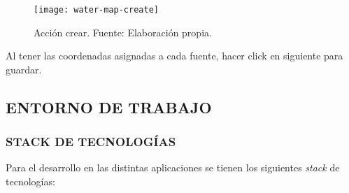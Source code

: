 \begin{figure}[H]
   \centering
   \texttt{[image: water-map-create]}
   \caption{\label{fig:water-map-create} Acción crear. Fuente: Elaboración propia.}
\end{figure}

Al tener las coordenadas asignadas a cada fuente, hacer click en siguiente para guardar.
\fi


\subsection{ENTORNO DE TRABAJO}

\subsubsection{STACK DE TECNOLOGÍAS}

Para el desarrollo en las distintas aplicaciones se tienen los siguientes \textit{stack} de tecnologías:


